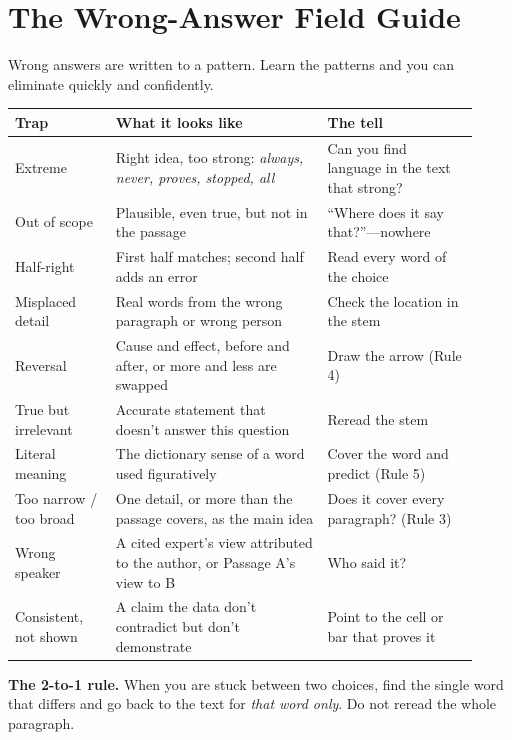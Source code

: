 \documentclass[11pt]{article}
\begin{document}
\section{The Wrong-Answer Field Guide}
Wrong answers are written to a pattern. Learn the patterns and you can eliminate quickly and confidently.

\begin{center}
\small
\begin{tabular}{@{}p{0.2\linewidth}p{0.42\linewidth}p{0.3\linewidth}@{}}
\toprule
\textbf{Trap} & \textbf{What it looks like} & \textbf{The tell}\\
\midrule
Extreme & Right idea, too strong: \emph{always, never, proves, stopped, all} & Can you find language in the text that strong?\\
Out of scope & Plausible, even true, but not in the passage & ``Where does it say that?''---nowhere\\
Half-right & First half matches; second half adds an error & Read every word of the choice\\
Misplaced detail & Real words from the wrong paragraph or wrong person & Check the location in the stem\\
Reversal & Cause and effect, before and after, or more and less are swapped & Draw the arrow (Rule 4)\\
True but irrelevant & Accurate statement that doesn't answer this question & Reread the stem\\
Literal meaning & The dictionary sense of a word used figuratively & Cover the word and predict (Rule 5)\\
Too narrow / too broad & One detail, or more than the passage covers, as the main idea & Does it cover every paragraph? (Rule 3)\\
Wrong speaker & A cited expert's view attributed to the author, or Passage A's view to B & Who said it?\\
Consistent, not shown & A claim the data don't contradict but don't demonstrate & Point to the cell or bar that proves it\\
\bottomrule
\end{tabular}
\end{center}

\textbf{The 2-to-1 rule.} When you are stuck between two choices, find the single word that differs and go back to the text for \emph{that word only}. Do not reread the whole paragraph.
\end{document}
